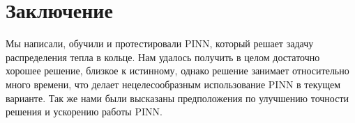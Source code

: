 \documentclass[a4paper,14pt]{extarticle} %
\begin{document}
\FloatBarrier
\newpage
\section{Заключение}

Мы написали, обучили и протестировали PINN, который решает задачу распределения тепла в кольце. Нам удалось получить в целом достаточно хорошее решение, близкое к истинному, однако решение занимает относительно много времени, что делает нецелесообразным использование PINN в текущем варианте. Так же нами были высказаны предположения по улучшению точности решения и ускорению работы PINN.
\newpage



\end{document}

